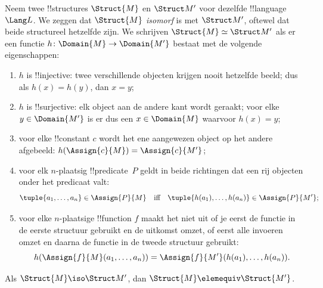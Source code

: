 \documentclass[../../../include/open-logic-section]{subfiles}
\begin{document}
\begin{defn}
 Neem twee !!{structure}s $\Struct{M}$ en
$\Struct M'$ voor dezelfde !!{language}~$\Lang L$. We zeggen dat
$\Struct{M}$ \emph{isomorf} is met $\Struct M'$, oftewel dat beide
structureel hetzelfde zijn. We schrijven $\Struct{M}
\simeq \Struct M'$ als er een functie $h \colon
\Domain{M} \to \Domain{M'}$ bestaat met de volgende eigenschappen:
\begin{enumerate}
\item $h$ is !!{injective}: twee verschillende objecten krijgen nooit
  hetzelfde beeld; dus als $h(x) = h(y)$, dan $x = y$; 
\item $h$ is !!{surjective}: elk object aan de andere kant wordt geraakt;
  voor elke $y \in \Domain{M'}$ is er dus een $x \in \Domain{M}$ waarvoor
  $h(x) = y$;
\item {}voor elke !!{constant} $c$ wordt het ene
  aangewezen object op het andere afgebeeld:
  $h(\Assign{c}{M}) = \Assign{c}{M'}$;
\item {}voor elk $n$-plaatsig !!{predicate}~$P$
  geldt in beide richtingen dat een rij objecten onder het predicaat valt:
  \[
  \tuple{a_1, \dots, a_n}\in \Assign{P}{M} \quad\text{iff}\quad
  \tuple{h(a_1), \dots, h(a_n)} \in \Assign{P}{M'};
  \]
\item {}voor elke $n$-plaatsige !!{function} $f$
  maakt het niet uit of je eerst de functie in de eerste structuur
  gebruikt en de uitkomst omzet, of eerst alle invoeren omzet en daarna
  de functie in de tweede structuur gebruikt:
  \[
  h(\Assign{f}{M}(a_1, \dots, a_n)) =
  \Assign{f}{M'}(h(a_1), \dots, h(a_n)).
  \]
\end{enumerate}
\end{defn}

\begin{thm}
Als $\Struct{M} \iso \Struct M'$, dan $\Struct{M} \elemequiv
\Struct{M'}$.
\end{thm}
\end{document}
